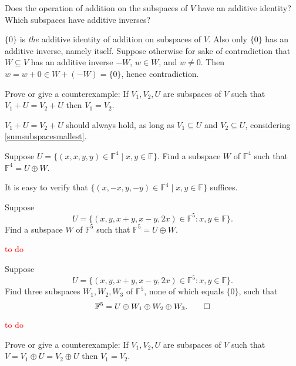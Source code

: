 \setcounter{exercise}{17}

\begin{exercise}
  Does the operation of addition on the subspaces of $V$ have an additive identity? Which subspaces have additive inverses?
\end{exercise}

$\{0\}$ is \textit{the} additive identity of addition on subspaces of $V$. Also only $\{0\}$ has an additive inverse, namely itself. Suppose otherwise for sake of contradiction that $W\subseteq V$ has an additive inverse $-W$, $w\in W$, and $w\neq0$. Then $w=w+0\in W+(-W)=\{0\}$, hence contradiction.

\begin{exercise}
  Prove or give a counterexample: If $V_1,V_2,U$ are subspaces of $V$ such that $V_1+U=V_2+U$ then $V_1=V_2$.
\end{exercise}

$V_1+U=V_2+U$ should always hold, as long as $V_1\subseteq U$ and $V_2\subseteq U$, considering \ref{sumsubspacesmallest}.

\begin{exercise}
  Suppose $U=\{(x,x,y,y)\in \mathbb F^4\mid x,y\in \mathbb F\}$. Find a subspace $W$ of $\mathbb F^4$ such that $\mathbb F^4=U\oplus W$.
\end{exercise}

It is easy to verify that $\{(x,-x,y,-y)\in \mathbb F^4\mid x,y\in \mathbb F\}$ suffices.

\begin{exercise}
  Suppose
  \[
    U = \{(x, y, x + y, x - y, 2x) \in \mathbb{F}^5 : x, y \in \mathbb{F} \}.
  \]
  Find a subspace \( W \) of \( \mathbb{F}^5 \) such that \( \mathbb{F}^5 = U \oplus W \).
\end{exercise}

\textcolor{red}{to do}

\begin{exercise}
  Suppose
  \[
    U = \{(x, y, x + y, x - y, 2x) \in \mathbb{F}^5 : x, y \in \mathbb{F} \}.
  \]
  Find three subspaces \( W_1, W_2, W_3 \) of \( \mathbb{F}^5 \), none of which equals \( \{0\} \), such that
  \[
    \mathbb{F}^5 = U \oplus W_1 \oplus W_2 \oplus W_3.\qedhere
  \]
\end{exercise}

\textcolor{red}{to do}

\begin{exercise}
  Prove or give a counterexample: If $V_1,V_2,U$ are subspaces of $V$ such that $V=V_1\oplus U=V_2\oplus U$ then $V_1=V_2$.
\end{exercise}

